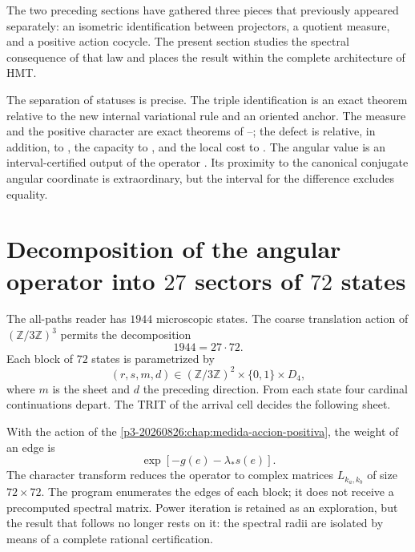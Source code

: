 \label{p3-20260826:chap:operador-angular-dictamen}

The two preceding sections have gathered three pieces that previously appeared
separately: an isometric identification between projectors, a quotient measure,
and a positive action cocycle. The present section studies the spectral consequence
of that law and places the result within the complete architecture
of HMT\@.

The separation of statuses is precise. The triple identification is an exact theorem
relative to the new internal variational rule and an oriented anchor.
The measure and the positive character are exact theorems of \HTr--\HAdd; the defect
is relative, in addition, to \HDef, the capacity to \HRes, and the local cost to \HLoc. The
angular value is an interval-certified output of the operator \Gtr. Its
proximity to the canonical conjugate angular coordinate is extraordinary, but the interval for
the difference excludes equality.

\section{Decomposition of the angular operator into \(27\) sectors of \(72\) states}

The all-paths reader \Gtr has \(1944\) microscopic states. The
coarse translation action of \((\mathbb Z/3\mathbb Z)^3\) permits the
decomposition
\[
 1944=27\cdot72.
\]
Each block of \(72\) states is parametrized by
\[
 (r,s,m,d)
 \in(\mathbb Z/3\mathbb Z)^2\times\{0,1\}\times D_4,
\]
where \(m\) is the sheet and \(d\) the preceding direction. From each state
four cardinal continuations depart. The TRIT of the arrival cell
decides the following sheet.

With the action of the \cref{p3-20260826:chap:medida-accion-positiva}, the weight of an edge
is
\[
 \exp[-g(e)-\lambda_*s(e)].
\]
The character transform reduces the operator to complex matrices
\(L_{k_a,k_b}\) of size \(72\times72\). The program enumerates the
edges of each block; it does not receive a precomputed spectral matrix. Power
iteration is retained as an exploration, but the result that
follows no longer rests on it: the spectral radii are isolated by means of a
complete rational certification.

